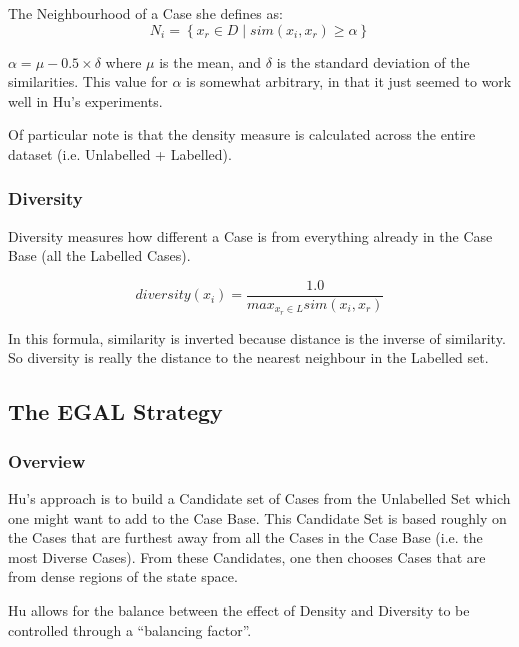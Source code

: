 \documentclass[a4paper,11pt]{report}
\begin{document}
The Neighbourhood of a Case she defines as:
\[
N_{i}=\left\{ x_{r}\in D\mid sim(x_{i},x_{r})\geq\alpha\right\} 
\]

$\alpha=\mu-0.5\times\delta$ where $\mu$ is the mean, and $\delta$ is the standard deviation of the similarities. This value for $\alpha$ is somewhat arbitrary, in that it just seemed to work well in Hu's experiments.

Of particular note is that the density measure is calculated across the entire dataset (i.e. Unlabelled + Labelled). 

\subsubsection{Diversity}

Diversity measures how different a Case is from everything already in the Case Base (all the Labelled Cases).

\[
diversity(x_{i})=\frac{1.0}{max_{x_{r}\in L}sim(x_{i},x_{r})}
\]

In this formula, similarity is inverted because distance is the inverse of similarity. So diversity is really the distance to the nearest neighbour in the Labelled set.

\subsection{The EGAL Strategy}

\subsubsection{Overview}
Hu's approach is to build a Candidate set of Cases from the Unlabelled Set which one might want to add to the Case Base. This Candidate Set is based roughly on the Cases that are furthest away from all the Cases in the Case Base (i.e. the most Diverse Cases). From these Candidates, one then chooses Cases that are from dense regions of the state space.

Hu allows for the balance between the effect of Density and Diversity to be controlled through a ``balancing factor''.

\pagebreak %
\end{document}
